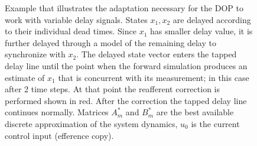 \begin{figure}[h!]
    \centering

    \caption{Example that illustrates the adaptation necessary for the DOP to work with variable delay signals. States \ensuremath{x_1, x_2} are delayed according to their individual dead times. Since \ensuremath{x_1} has smaller delay value, it is further delayed through a model of the remaining delay to synchronize with \ensuremath{x_2}. The delayed state vector enters the tapped delay line until the point when the forward simulation produces an estimate of \ensuremath{x_1} that is concurrent with its measurement; in this case after 2 time steps. At that point the reafferent correction is performed shown  in red. After the correction the tapped delay line continues normally. Matrices \ensuremath{A^*_m} and \ensuremath{B^*_m} are the best available discrete approximation of the system dynamics, \ensuremath{u_0} is the current control input (efference copy).}
    \label{fig:VDROP_line}
\end{figure}
